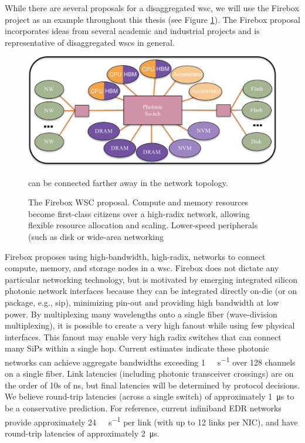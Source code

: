 While there are several proposals for a disaggregated \acrlong{wsc}, we will
use the Firebox\cite{firebox} project as an example throughout this thesis (see
Figure \ref{fig:fb_diagram}). The Firebox proposal incorporates ideas from
several academic and industrial projects and is representative of disaggregated
\glspl{wsc} in general.

\begin{figure}
    \centering
    \includegraphics[width=0.9\columnwidth]{figs/FBDiagram.pdf} \label{fig:fb_diagram}
    \caption{The Firebox WSC proposal. Compute and memory resources become
    first-class citizens over a high-radix network, allowing flexible resource
    allocation and scaling. Lower-speed peripherals (such as disk or wide-area
    networking} can be connected farther away in the network topology.
\end{figure}

Firebox proposes using high-bandwidth, high-radix, networks to connect compute,
memory, and storage nodes in a \gls{wsc}. Firebox does not dictate any particular
networking technology, but is motivated by emerging integrated silicon photonic
network interfaces because they can be integrated directly on-die (or on
package, e.g., \gls{sip}), minimizing pin-out and providing high bandwidth at
low power. By multiplexing many wavelengths onto a single fiber (wave-division
multiplexing), it is possible to create a very high fanout while using few
physical interfaces. This fanout may enable very high radix switches that can
connect many SiPs within a single hop. Current estimates indicate these
photonic networks can achieve aggregate bandwidths exceeding
\SI{1}{\tera\bit\per\second} over 128 channels on a single
fiber\cite{naturePhotonic}\cite{Photonic09}. Link latencies (including photonic
transceiver crossings) are on the order of 10s of \si{\nano\second}, but final
latencies will be determined by protocol decisions. We believe round-trip
latencies (across a single switch) of approximately \SI{1}{\micro\second} to be
a conservative prediction. For reference, current infiniband EDR networks
provide approximately \SI{24}{\giga\bit\per\second} per link (with up to 12
links per NIC), and have round-trip latencies of approximately
\SI{2}{\micro\second}\cite{binnigNW}.

